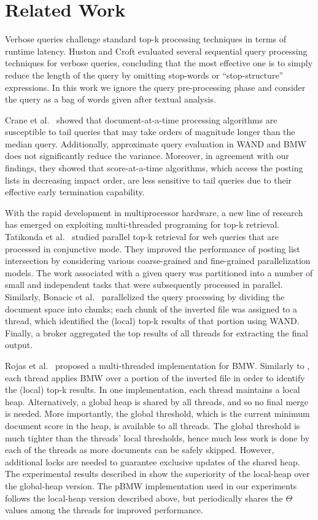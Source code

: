 \section{Related Work}
\label{sec:related}

Verbose queries challenge standard top-k processing techniques in terms of runtime latency. Huston and Croft \cite{Huston:2010} evaluated several sequential query processing techniques for verbose queries, concluding that the most effective one is to simply reduce the length of the query by omitting stop-words or ``stop-structure'' expressions. 
In this work we ignore the query pre-processing phase and consider the query as a bag of words given after textual analysis.

Crane et al.~\cite{Crane:2017} showed that document-at-a-time processing algorithms are susceptible to tail queries that may take orders of magnitude longer than the median query. Additionally, approximate query evaluation in WAND and BMW does not significantly reduce the variance. Moreover, in agreement with our findings, they showed that score-at-a-time algorithms, which access the  posting lists in decreasing impact order, are less sensitive to tail queries due to their effective early termination capability. 

With the rapid development in multiprocessor hardware, a new line of research has emerged on exploiting multi-threaded programing for top-k retrieval. Tatikonda 
et al.~\cite{Tatikonda:2011} studied parallel top-k retrieval for web queries that are processed in conjunctive mode. They improved the performance of posting list intersection by considering various coarse-grained and fine-grained parallelization models. The work associated with a given query was partitioned into a number of small and independent tasks that were subsequently processed in parallel.  Similarly, Bonacic et al.~\cite{Bonacic:2010} parallelized the query processing by dividing the document space into chunks; each chunk of the inverted file was assigned to a thread, which identified the (local) top-k results of that portion using WAND. Finally, a broker aggregated the top results of all threads for extracting the final output. 

Rojas et al.~\cite{rojas2013efficient} proposed a multi-threaded implementation for BMW. Similarly to \cite{Bonacic:2010}, each thread applies BMW over a portion of the inverted file in order to identify the (local) top-k results. In one implementation, each thread maintains a local heap. Alternatively, a global heap is shared by all threads, and so no final merge is needed. More importantly, the global threshold, which is the current minimum document score in the heap, is available to all threads. The global threshold is much tighter than the threads' local thresholds, hence much less work is done by each of the threads as  more documents can be safely skipped. However, additional locks are needed to guarantee exclusive updates of the shared heap. The experimental results described in \cite{rojas2013efficient} show the superiority of the local-heap over the global-heap version. The pBMW implementation used in our experiments follows the local-heap version described above,
but periodically shares the  $\Theta$ values among the threads for improved performance.

